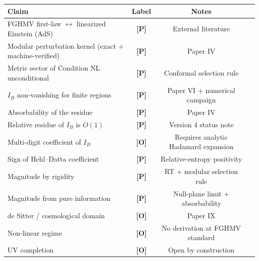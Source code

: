 \documentclass[11pt]{article}
\newcommand{\pP}{\textbf{[P]}}
\newcommand{\pO}{\textbf{[O]}}
\begin{document}
\begin{center}
\small
\begin{tabular}{@{}p{}cc p{}@{}}
\toprule
Claim & Label & Notes \\
\midrule
FGHMV first-law $\leftrightarrow$ linearized Einstein (AdS) & \pP{} & External literature \\
Modular perturbation kernel (exact + machine-verified) & \pP{} & Paper IV \\
Metric sector of Condition NL unconditional & \pP{} & Conformal selection rule \\
$I_B$ non-vanishing for finite regions & \pP{} & Paper VI + numerical campaign \\
Absorbability of the residue & \pP{} & Paper IV \\
Relative residue of $I_B$ is $O(1)$ & \pP{} & Version 4 status note \\
Multi-digit coefficient of $I_B$ & \pO{} & Requires analytic Hadamard expansion \\
Sign of Hehl--Datta coefficient & \pP{} & Relative-entropy positivity \\
Magnitude by rigidity & \pP{} & RT + modular selection rule \\
Magnitude from pure information & \pP{} & Null-plane limit + absorbability \\
de Sitter / cosmological domain & \pO{} & Paper IX \\
Non-linear regime & \pO{} & No derivation at FGHMV standard \\
UV completion & \pO{} & Open by construction \\
\bottomrule
\end{tabular}
\end{center}
\end{document}
